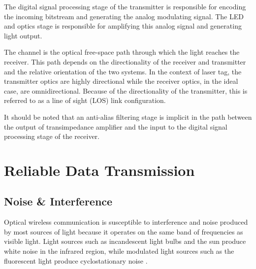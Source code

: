 The digital signal processing stage of the transmitter is responsible for encoding the incoming bitstream and generating the analog modulating signal. The LED and optics stage is responsible for amplifying this analog signal and generating light output.

The channel is the optical free-space path through which the light reaches the receiver. This path depends on the directionality of the receiver and transmitter and the relative orientation of the two systems. In the context of laser tag, the transmitter optics are highly directional while the receiver optics, in the ideal case, are omnidirectional. Because of the directionality of the transmitter, this is referred to as a line of sight (LOS) link configuration.

It should be noted that an anti-alias filtering stage is implicit in the path between the output of transimpedance amplifier and the input to the digital signal processing stage of the receiver.



\section{Reliable Data Transmission}

\subsection{Noise \& Interference}


Optical wireless communication is susceptible to interference and noise produced by most sources of light because it operates on the same band of frequencies as visible light. Light sources such as incandescent light bulbs and the sun produce white noise in the infrared region, while modulated light sources such as the fluorescent light produce cyclostationary noise \cite{Carruther2000}.

